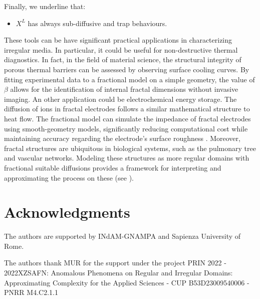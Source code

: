 \documentclass[[11pt,a4paper,reqno]{article}
\numberwithin{equation}{section}
\begin{document}
Finally, we underline that:
\begin{itemize}
\item[i)] $X^L$ has always sub-diffusive and trap behaviours. 
\end{itemize}





These tools can be have  significant practical applications in characterizing irregular media.
In particular, it could be useful for non-destructive thermal diagnostics. In fact, 
in the field of material science, the structural integrity of porous thermal barriers can be assessed by observing surface cooling curves. By fitting experimental data to a fractional model on a simple geometry, the value of $\beta$ allows for the identification of internal fractal dimensions without invasive imaging. 
An other application could be electrochemical energy storage.
The diffusion of ions in fractal electrodes follows a similar mathematical structure to heat flow. The  fractional model can simulate the impedance of fractal electrodes using smooth-geometry models, significantly reducing computational cost while maintaining accuracy regarding the electrode's surface roughness \cite{pajkossy}.
Moreover, fractal structures are ubiquitous in biological systems, such as the pulmonary tree and vascular networks. Modeling these structures  as more regular domains with fractional suitable diffusions provides a  framework for interpreting and approximating  the process on these   (see \cite{magin}).



 \section*{Acknowledgments}


The authors are supported by INdAM-GNAMPA and Sapienza University of Rome. 

The authors thank MUR for the support under the project PRIN 2022 - 2022XZSAFN: Anomalous Phenomena on Regular and Irregular Domains: Approximating Complexity for the Applied Sciences - CUP B53D23009540006 - PNRR M4.C2.1.1 
\end{document}

